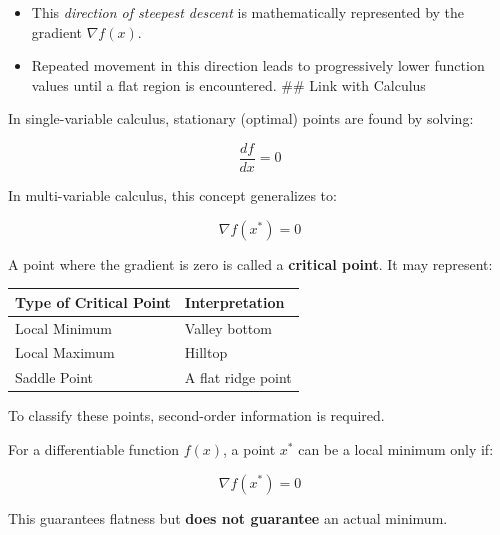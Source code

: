 \documentclass[
  letterpaper,
  DIV=11,
  numbers=noendperiod]{scrreprt}
\providecommand{\tightlist}{%
  \setlength{\itemsep}{0pt}\setlength{\parskip}{0pt}}
\begin{document}
\begin{tcolorbox}[enhanced jigsaw, leftrule=.75mm, rightrule=.15mm, colback=white, colbacktitle=quarto-callout-note-color!10!white, arc=.35mm, opacityback=0, toptitle=1mm, bottomrule=.15mm, bottomtitle=1mm, titlerule=0mm, title=\textcolor{quarto-callout-note-color}{\faInfo}\hspace{0.5em}{Key points}, toprule=.15mm, left=2mm, coltitle=black, breakable, colframe=quarto-callout-note-color-frame, opacitybacktitle=0.6]

\begin{itemize}
\tightlist
\item
  This \emph{direction of steepest descent} is mathematically
  represented by the gradient \(\nabla f(x)\).
\item
  Repeated movement in this direction leads to progressively lower
  function values until a flat region is encountered. \#\# Link with
  Calculus
\end{itemize}

In single-variable calculus, stationary (optimal) points are found by
solving:

\[
\frac{df}{dx} = 0
\]

In multi-variable calculus, this concept generalizes to:

\[
\nabla f(x^{*}) = 0
\]

A point where the gradient is zero is called a \textbf{critical point}.
It may represent:

\begin{longtable}[]{@{}ll@{}}
\toprule\noalign{}
Type of Critical Point & Interpretation \\
\midrule\noalign{}
\endhead
\bottomrule\noalign{}
\endlastfoot
Local Minimum & Valley bottom \\
Local Maximum & Hilltop \\
Saddle Point & A flat ridge point \\
\end{longtable}

To classify these points, second-order information is required.

\end{tcolorbox}

\begin{tcolorbox}[enhanced jigsaw, leftrule=.75mm, rightrule=.15mm, colback=white, colbacktitle=quarto-callout-tip-color!10!white, arc=.35mm, opacityback=0, toptitle=1mm, bottomrule=.15mm, bottomtitle=1mm, titlerule=0mm, title=\textcolor{quarto-callout-tip-color}{\faLightbulb}\hspace{0.5em}{First-Order Necessary Condition (FONC)}, toprule=.15mm, left=2mm, coltitle=black, breakable, colframe=quarto-callout-tip-color-frame, opacitybacktitle=0.6]

For a differentiable function \(f(x)\), a point \(x^{*}\) can be a local
minimum only if:

\[
\nabla f(x^{*}) = 0
\]

This guarantees flatness but \textbf{does not guarantee} an actual
minimum.

\end{tcolorbox}
\end{document}

